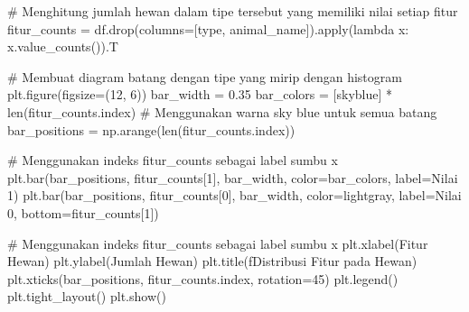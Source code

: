 \documentclass[
  letterpaper,
]{krantz}
\makeatletter
\newenvironment{Shaded}{\begin{snugshade}}{\end{snugshade}}
\newcommand{\BuiltInTok}[1]{\textcolor[rgb]{0.00,0.23,0.31}{#1}}
\newcommand{\CommentTok}[1]{\textcolor[rgb]{0.37,0.37,0.37}{#1}}
\newcommand{\DecValTok}[1]{\textcolor[rgb]{0.68,0.00,0.00}{#1}}
\newcommand{\FloatTok}[1]{\textcolor[rgb]{0.68,0.00,0.00}{#1}}
\newcommand{\KeywordTok}[1]{\textcolor[rgb]{0.00,0.23,0.31}{#1}}
\newcommand{\NormalTok}[1]{\textcolor[rgb]{0.00,0.23,0.31}{#1}}
\newcommand{\OperatorTok}[1]{\textcolor[rgb]{0.37,0.37,0.37}{#1}}
\newcommand{\SpecialStringTok}[1]{\textcolor[rgb]{0.13,0.47,0.30}{#1}}
\newcommand{\StringTok}[1]{\textcolor[rgb]{0.13,0.47,0.30}{#1}}
\newenvironment{kframe}{%
\medskip{}
\setlength{\fboxsep}{.8em}
 \def\at@end@of@kframe{}%
 \ifinner\ifhmode%
  \def\at@end@of@kframe{\end{minipage}}%
  \begin{minipage}{\columnwidth}%
 \fi\fi%
 \def\FrameCommand##1{\hskip\@totalleftmargin \hskip-\fboxsep
 \colorbox{shadecolor}{##1}\hskip-\fboxsep
     \hskip-\linewidth \hskip-\@totalleftmargin \hskip\columnwidth}%
 \MakeFramed {\advance\hsize-\width
   \@totalleftmargin\z@ \linewidth\hsize
   \@setminipage}}%
 {\par\unskip\endMakeFramed%
 \at@end@of@kframe}
\renewenvironment{Shaded}{\begin{kframe}}{\end{kframe}}
\makeatother
\begin{document}
\begin{Shaded}
\begin{Highlighting}[]
\CommentTok{\# Menghitung jumlah hewan dalam tipe tersebut yang memiliki nilai setiap fitur}
\NormalTok{fitur\_counts }\OperatorTok{=}\NormalTok{ df.drop(columns}\OperatorTok{=}\NormalTok{[}\StringTok{\textquotesingle{}type\textquotesingle{}}\NormalTok{, }\StringTok{\textquotesingle{}animal\_name\textquotesingle{}}\NormalTok{]).}\BuiltInTok{apply}\NormalTok{(}\KeywordTok{lambda}\NormalTok{ x: x.value\_counts()).T}

\CommentTok{\# Membuat diagram batang dengan tipe yang mirip dengan histogram}
\NormalTok{plt.figure(figsize}\OperatorTok{=}\NormalTok{(}\DecValTok{12}\NormalTok{, }\DecValTok{6}\NormalTok{))}
\NormalTok{bar\_width }\OperatorTok{=} \FloatTok{0.35}
\NormalTok{bar\_colors }\OperatorTok{=}\NormalTok{ [}\StringTok{\textquotesingle{}skyblue\textquotesingle{}}\NormalTok{] }\OperatorTok{*} \BuiltInTok{len}\NormalTok{(fitur\_counts.index)  }\CommentTok{\# Menggunakan warna sky blue untuk semua batang}
\NormalTok{bar\_positions }\OperatorTok{=}\NormalTok{ np.arange(}\BuiltInTok{len}\NormalTok{(fitur\_counts.index))}

\CommentTok{\# Menggunakan indeks fitur\_counts sebagai label sumbu x}
\NormalTok{plt.bar(bar\_positions, fitur\_counts[}\DecValTok{1}\NormalTok{], bar\_width, color}\OperatorTok{=}\NormalTok{bar\_colors, label}\OperatorTok{=}\StringTok{\textquotesingle{}Nilai 1\textquotesingle{}}\NormalTok{)}
\NormalTok{plt.bar(bar\_positions, fitur\_counts[}\DecValTok{0}\NormalTok{], bar\_width, color}\OperatorTok{=}\StringTok{\textquotesingle{}lightgray\textquotesingle{}}\NormalTok{, label}\OperatorTok{=}\StringTok{\textquotesingle{}Nilai 0\textquotesingle{}}\NormalTok{, bottom}\OperatorTok{=}\NormalTok{fitur\_counts[}\DecValTok{1}\NormalTok{])}

\CommentTok{\# Menggunakan indeks fitur\_counts sebagai label sumbu x}
\NormalTok{plt.xlabel(}\StringTok{\textquotesingle{}Fitur Hewan\textquotesingle{}}\NormalTok{)}
\NormalTok{plt.ylabel(}\StringTok{\textquotesingle{}Jumlah Hewan\textquotesingle{}}\NormalTok{)}
\NormalTok{plt.title(}\SpecialStringTok{f\textquotesingle{}Distribusi Fitur pada Hewan\textquotesingle{}}\NormalTok{)}
\NormalTok{plt.xticks(bar\_positions, fitur\_counts.index, rotation}\OperatorTok{=}\DecValTok{45}\NormalTok{)}
\NormalTok{plt.legend()}
\NormalTok{plt.tight\_layout()}
\NormalTok{plt.show()}
\end{Highlighting}
\end{Shaded}
\end{document}
